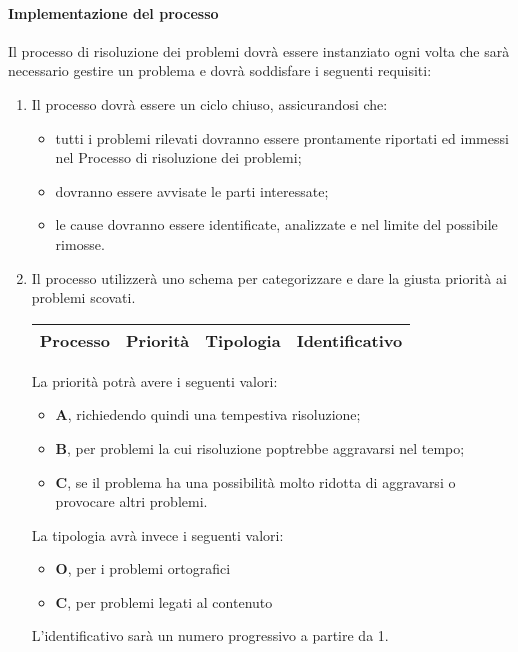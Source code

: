 		\paragraph{Implementazione del processo}
			Il processo di risoluzione dei problemi dovrà essere instanziato ogni volta che sarà necessario gestire un problema e dovrà soddisfare i seguenti requisiti:
			\begin{enumerate}
				\item Il processo dovrà essere un ciclo chiuso, assicurandosi che:
					\begin{itemize}
				 		\item tutti i problemi rilevati dovranno essere prontamente riportati ed immessi nel Processo di risoluzione dei problemi;
					 	\item dovranno essere avvisate le parti interessate;
				 		\item le cause dovranno essere identificate, analizzate e nel limite del possibile rimosse.
					 \end{itemize}  
				
				\item Il processo utilizzerà uno schema per categorizzare e dare la giusta priorità ai problemi scovati.

					\begin{center}
						\begin{longtable}{|c|c|c|c|}
							\hline
							\rowcolor{lighter-grayer}
							\textbf{Processo} & \textbf{Priorità} & \textbf{Tipologia} & \textbf{Identificativo}\\
							\hline
							\endfirsthead
							\hline
			
						\end{longtable}
					\end{center}

				 La priorità potrà avere i seguenti valori:
					\begin{itemize}
					 	\item \textbf{A}, richiedendo quindi una tempestiva risoluzione;
					 	\item \textbf{B}, per problemi la cui risoluzione poptrebbe aggravarsi nel tempo;
					 	\item \textbf{C}, se il problema ha una possibilità molto ridotta di aggravarsi o provocare altri problemi. 
					 \end{itemize} 
				 La tipologia avrà invece i seguenti valori:
					\begin{itemize}
						\item \textbf{O}, per i problemi ortografici
						\item \textbf{C}, per problemi legati al contenuto
					\end{itemize}
				 L'identificativo sarà un numero progressivo a partire da 1.	
					

\end{enumerate}
